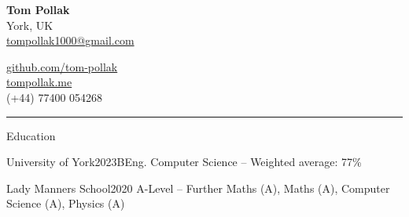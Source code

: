 \documentclass{structure}
\begin{document}
\parbox{0.5\textwidth}{ 
{\namesize\bf{Tom Pollak}} \\[6pt]
York, UK\\ 
\href{mailto:tompollak1000@gmail.com}{tompollak1000@gmail.com}
}
\hfill 
\parbox{0.5\textwidth}{ 
\vspace*{10pt}

\begin{flushright}

\href{https://github.com/tom-pollak}{github.com/tom-pollak} \\
\href{https://tompollak.me}{tompollak.me} \\
(+44) 77400 054268
\end{flushright}

}

\smallskip
\hrule
\smallskip

\begin{rSection}{Education}

\begin{rSubsectionNoList}{University of York}{2023}{BEng. Computer Science -- Weighted average: 77\% }{}{}
\end{rSubsectionNoList}

\begin{rSubsectionNoList}{Lady Manners School}{2020}{
    A-Level --  Further Maths (A), Maths (A), Computer Science (A), Physics (A)  
}{}{}
\end{rSubsectionNoList}

\end{rSection}

\end{document}
